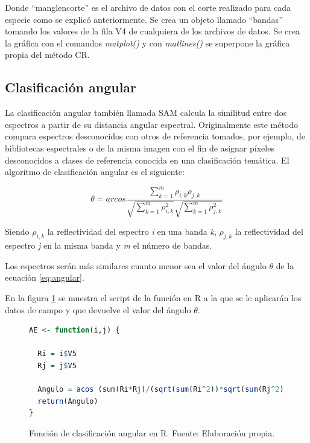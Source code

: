 Donde ``manglencorte'' es el archivo de datos con el corte realizado para cada especie como se explicó anteriormente. Se crea un objeto llamado ``bandas'' tomando los valores de la fila V4 de cualquiera de los archivos de datos. Se crea la gráfica con el comandos \textit{matplot()} y con \textit{matlines()} se superpone la gráfica propia del método \ac{CR}.\Sep

\subsection{Clasificación angular}
La clasificación angular también llamada \ac{SAM} calcula la similitud entre dos espectros a partir de su distancia angular espectral. Originalmente este método compara espectros desconocidos con otros de referencia tomados, por ejemplo, de bibliotecas espectrales o de la misma imagen \citep{girouard2004validated} con el fin de asignar píxeles desconocidos a clases de referencia conocida en una clasificación temática. El algoritmo de clasificación angular es el siguiente:

\begin{equation} \label{eq:angular}
	\theta = arcos \frac{\sum_{k=1}^{m} \rho_{i,k} \rho_{j,k}}{\sqrt{\sum_{k=1}^{m} \rho_{i,k}^{2}} \sqrt{\sum_{k=1}^{m} \rho_{j,k}^{2}}}
\end{equation}\Sep

Siendo $\rho_{i,k}$ la reflectividad del espectro \textit{i} en una banda \textit{k}, $\rho_{j,k}$ la reflectividad del espectro \textit{j} en la misma banda y \textit{m} el número de bandas.\Sep

Los espectros serán más similares cuanto menor sea el valor del ángulo $\theta$ de la ecuación \ref{eq:angular}.\Sep

En la figura \ref{fig:AE} se muestra el script de la función en R a la que se le aplicarán los datos de campo y que devuelve el valor del ángulo $\theta$.

\begin{figure}
\centering
\begin{lstlisting}[language = R, frame = single]
AE <- function(i,j) {
  
  Ri = i$V5
  Rj = j$V5

  Angulo = acos (sum(Ri*Rj)/(sqrt(sum(Ri^2))*sqrt(sum(Rj^2))))
  return(Angulo)
}
\end{lstlisting}
\caption[Función clasificación angular]{Función de clasificación angular en R. Fuente: Elaboración propia.}
\label{fig:AE}
\end{figure}

